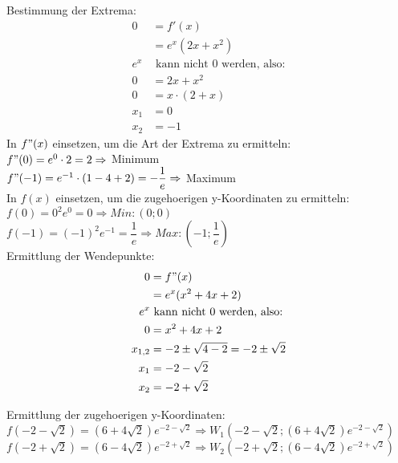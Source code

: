 \documentclass[
    10pt,
    parskip=half-,
    paper=a4,
    english,ngerman,
    fleqn
]{scrartcl}
\begin{document}
Bestimmung der Extrema:
\begin{align*}
    0 & = f'(x)\\
      & = e^x(2x+x^2)\\
e^x&\text{ kann nicht 0 werden, also:}\\
    0 & = 2x+x^2\\
    0 & = x \cdot (2+x)\\
    x_1 & = 0\\
    x_2 & = -1
\end{align*}
In $f"(x)$ einsetzen, um die Art der Extrema zu ermitteln:\\
$f"(0) = e^0 \cdot 2 = 2 \Rightarrow$ Minimum\\
$f"(-1) = e^{-1} \cdot (1 -4 + 2) = -\dfrac{1}{e} \Rightarrow$ Maximum\\
In $f(x)$ einsetzen, um die zugehoerigen y-Koordinaten zu ermitteln:\\
$f(0) = 0^2e^0 = 0 \Rightarrow Min: (0; 0)$\\
$f(-1) = (-1)^2 e^{-1} = \dfrac{1}{e} \Rightarrow Max: (-1; \dfrac{1}{e})$\\

Ermittlung der Wendepunkte:
\begin{align*}
    0 & = f"(x)\\
      & = e^x (x^2 + 4x + 2)\\
e^x&\text{ kann nicht 0 werden, also:}\\
    0 & = x^2 + 4x + 2\\
    x_{1,2} & = -2 \pm \sqrt{4-2} = -2 \pm \sqrt{2}\\
    x_1 & = -2 - \sqrt{2}\\
    x_2 & = -2 + \sqrt{2}\\
\end{align*}

Ermittlung der zugehoerigen y-Koordinaten:\\
$f(-2-\sqrt{2}) = (6+4\sqrt{2})e^{-2-\sqrt{2}} \Rightarrow W_1(-2-\sqrt{2};(6+4\sqrt{2})e^{-2-\sqrt{2}})$\\
$f(-2+\sqrt{2}) = (6-4\sqrt{2})e^{-2+\sqrt{2}} \Rightarrow W_2(-2+\sqrt{2};(6-4\sqrt{2})e^{-2+\sqrt{2}})$\\
\end{document}

